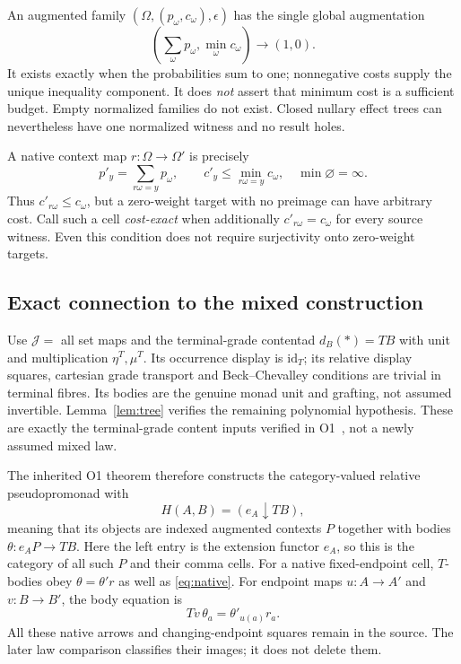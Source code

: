 \documentclass[11pt,a4paper]{article}
\theoremstyle{definition}
\newcommand{\id}{\mathrm{id}}
\begin{document}
An augmented family $(\Omega,(p_\omega,c_\omega),\epsilon)$ has the
single global augmentation
\[
 (\textstyle\sum_\omega p_\omega,\min_\omega c_\omega)
           \longrightarrow(1,0).
\]
It exists exactly when the probabilities sum to one; nonnegative costs
supply the unique inequality component. It does \emph{not} assert that
minimum cost is a sufficient budget. Empty normalized families do not
exist. Closed nullary effect trees can nevertheless have one normalized
witness and no result holes.

A native context map $r:\Omega\to\Omega'$ is precisely
\begin{equation}\label{eq:native}
 p'_y=\sum_{r\omega=y}p_\omega,
 \qquad c'_y\le\min_{r\omega=y}c_\omega,
 \quad\min\varnothing=\infty.
\end{equation}
Thus $c'_{r\omega}\le c_\omega$, but a zero-weight target with no preimage
can have arbitrary cost. Call such a cell \emph{cost-exact} when additionally
$c'_{r\omega}=c_\omega$ for every source witness. Even this condition does
not require surjectivity onto zero-weight targets.

\subsection{Exact connection to the mixed construction}
Use $\mathcal J=$ all set maps and the terminal-grade contentad
$d_B(*)=TB$ with unit and multiplication $\eta^T,\mu^T$.
Its occurrence display is $\id_T$; its relative display squares,
cartesian grade transport and Beck--Chevalley conditions are trivial in
terminal fibres. Its bodies are the genuine monad unit and grafting, not
assumed invertible. Lemma~\ref{lem:tree} verifies the remaining polynomial
hypothesis. These are exactly the terminal-grade content inputs verified
in O1~\cite{O1}, not a newly assumed mixed law.

The inherited O1 theorem therefore constructs the category-valued relative
pseudopromonad with
\[
 H(A,B)=(e_A\downarrow TB),
\]
meaning that its objects are indexed augmented contexts $P$ together with
bodies $\theta:e_AP\to TB$. Here the left entry is the extension functor $e_A$, so this is the
category of all such $P$ and their comma cells. For a native
fixed-endpoint cell, $T$-bodies obey $\theta=\theta'r$ as well as
\eqref{eq:native}. For endpoint maps $u:A\to A'$ and $v:B\to B'$, the
body equation is
\begin{equation}\label{eq:endpoint}
 Tv\,\theta_a=\theta'_{u(a)}r_a.
\end{equation}
All these native arrows and changing-endpoint squares remain in the source.
The later law comparison classifies their images; it does not delete them.
\end{document}
